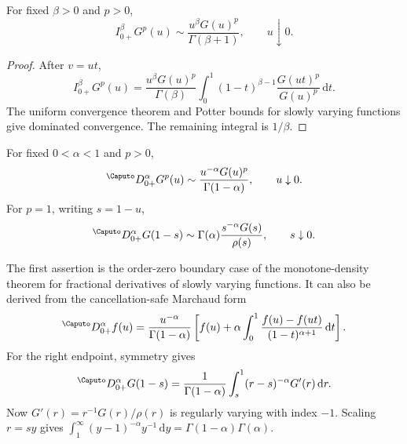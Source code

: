 \documentclass[11pt,oneside]{article}
\theoremstyle{definition}
\theoremstyle{remark}
\newcommand{\dd}{\,\mathrm d}
\newcommand{\1}{\mathbf 1}
\begin{document}
\begin{proposition}
\label{p11:prop:leading-RL-G}
For fixed $\beta>0$ and $p>0$,
\begin{equation}
 I_{0+}^{\beta}G^p(u)
 \sim\frac{u^\beta G(u)^p}{\Gamma(\beta+1)},
 \qquad u\downarrow0.
 \label{p11:eq:RL-G-leading}
\end{equation}
\end{proposition}

\begin{proof}
After $v=ut$,
\begin{equation}
 I_{0+}^{\beta}G^p(u)
 =\frac{u^\beta G(u)^p}{\Gamma(\beta)}
  \int_0^1(1-t)^{\beta-1}
  \frac{G(ut)^p}{G(u)^p}\dd t.
\end{equation}
The uniform convergence theorem and Potter bounds for slowly varying
functions give dominated convergence.  The remaining integral is $1/\beta$.
\end{proof}

\begin{proposition}
\label{p11:prop:caputo-endpoints}
For fixed $0<\alpha<1$ and $p>0$,
\begin{equation}
 {}^{\Caputo}D_{0+}^{\alpha}G^p(u)
 \sim\frac{u^{-\alpha}G(u)^p}{\Gamma(1-\alpha)},
 \qquad u\downarrow0.
 \label{p11:eq:caputo-left-leading}
\end{equation}
For $p=1$, writing $s=1-u$,
\begin{equation}
 {}^{\Caputo}D_{0+}^{\alpha}G(1-s)
 \sim\Gamma(\alpha)
 \frac{s^{-\alpha}G(s)}{\rho(s)},
 \qquad s\downarrow0.
 \label{p11:eq:caputo-right-leading}
\end{equation}
\end{proposition}

\begin{proofidea}
The first assertion is the order-zero boundary case of the monotone-density
theorem for fractional derivatives of slowly varying functions.  It can also
be derived from the cancellation-safe Marchaud form
\begin{equation}
 {}^{\Caputo}D_{0+}^{\alpha}f(u)
 =\frac{u^{-\alpha}}{\Gamma(1-\alpha)}\left[
 f(u)+\alpha\int_0^1
 \frac{f(u)-f(ut)}{(1-t)^{\alpha+1}}\dd t
 \right].
\end{equation}
For the right endpoint, symmetry gives
\begin{equation}
 {}^{\Caputo}D_{0+}^{\alpha}G(1-s)
 =\frac1{\Gamma(1-\alpha)}
  \int_s^1(r-s)^{-\alpha}G'(r)\dd r.
\end{equation}
Now $G'(r)=r^{-1}G(r)/\rho(r)$ is regularly varying with index $-1$.
Scaling $r=sy$ gives
$\int_1^\infty(y-1)^{-\alpha}y^{-1}\dd y
=\Gamma(1-\alpha)\Gamma(\alpha)$.
\end{proofidea}
\end{document}
